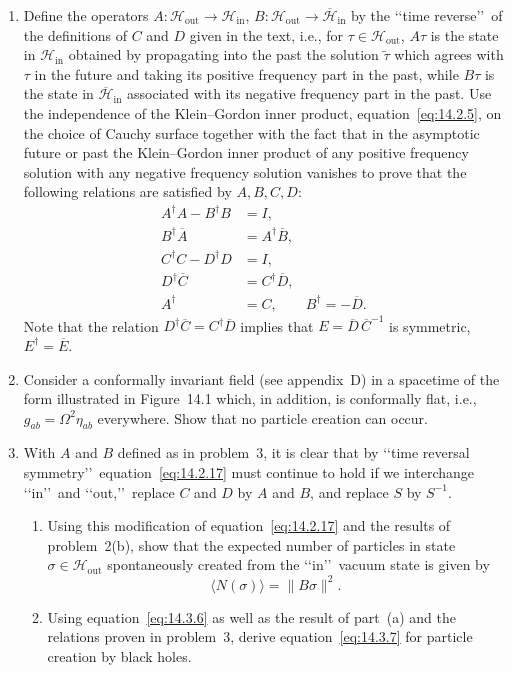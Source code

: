 \begin{enumerate}[label=\arabic*.,leftmargin=2em,itemsep=1.2ex]
\item
Define the operators
\(A\colon\mathcal H_{\mathrm{out}}\longrightarrow\mathcal H_{\mathrm{in}}\),
\(B\colon\mathcal H_{\mathrm{out}}\longrightarrow
\overline{\mathcal H}_{\mathrm{in}}\) by the \lq\lq time reverse\rq\rq\ of the
definitions of \(C\) and \(D\) given in the text, i.e., for
\(\tau\in\mathcal H_{\mathrm{out}}\), \(A\tau\) is the state in
\(\mathcal H_{\mathrm{in}}\) obtained by propagating into the past the solution
\(\widetilde\tau\) which agrees with \(\tau\) in the future and taking its positive
frequency part in the past, while \(B\tau\) is the state in
\(\overline{\mathcal H}_{\mathrm{in}}\) associated with its negative frequency part
in the past. Use the independence of the Klein--Gordon inner product,
equation~\eqref{eq:14.2.5}, on the choice of Cauchy surface together with the fact
that in the asymptotic future or past the Klein--Gordon inner product of any positive
frequency solution with any negative frequency solution vanishes to prove that the
following relations are satisfied by \(A,B,C,D\):
\begin{align*}
  A^\dagger A-B^\dagger B&=I,\\
  B^\dagger\overline A&=A^\dagger\overline B,\\
  C^\dagger C-D^\dagger D&=I,\\
  D^\dagger\overline C&=C^\dagger\overline D,\\
  A^\dagger&=C,\qquad B^\dagger=-\overline D.
\end{align*}
Note that the relation \(D^\dagger\overline C=C^\dagger\overline D\) implies
that \(E=\overline D\,\overline C^{-1}\) is symmetric,
\(E^\dagger=\overline E\).

\item
Consider a conformally invariant field (see appendix~D) in a spacetime of the form
illustrated in Figure~14.1 which, in addition, is conformally flat, i.e.,
\(g_{ab}=\Omega^2\eta_{ab}\) everywhere. Show that no particle creation can occur.

\item
With \(A\) and \(B\) defined as in problem~3, it is clear that by \lq\lq time
reversal symmetry\rq\rq\ equation~\eqref{eq:14.2.17} must continue to hold if we
interchange \lq\lq in\rq\rq\ and \lq\lq out,\rq\rq\ replace \(C\) and \(D\) by
\(A\) and \(B\), and replace \(S\) by \(S^{-1}\).
\begin{enumerate}[label=\alph*),leftmargin=2em,itemsep=.45ex]
\item Using this modification of equation~\eqref{eq:14.2.17} and the results of
problem~2(b), show that the expected number of particles in state
\(\sigma\in\mathcal H_{\mathrm{out}}\) spontaneously created from the
\lq\lq in\rq\rq\ vacuum state is given by
\[
  \langle N(\sigma)\rangle=\lVert B\sigma\rVert^2.
\]
\item Using equation~\eqref{eq:14.3.6} as well as the result of part~(a) and the
relations proven in problem~3, derive equation~\eqref{eq:14.3.7} for particle
creation by black holes.
\end{enumerate}


\end{enumerate}
